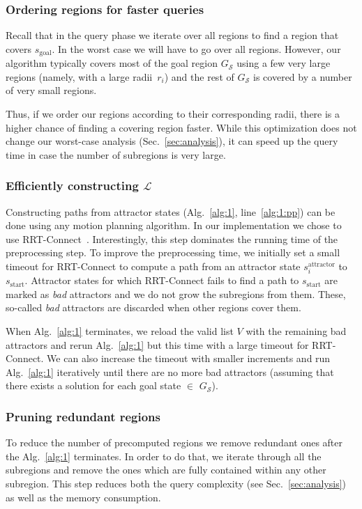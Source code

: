 \documentclass[letterpaper]{article} %
\newcommand{\calL}{\ensuremath{\mathcal{L}}\xspace}
\newcommand{\calS}{\ensuremath{\mathcal{S}}\xspace}
\newcommand{\sAttract}{\ensuremath{s^{\text{attractor}}_i}\xspace}
\newcommand{\sStart}{\ensuremath{s_{\text{start}}\xspace}}
\newcommand{\sGoal}{\ensuremath{s_{\text{goal}}\xspace}}
\begin{document}
\subsubsection{Ordering regions for faster queries}
Recall that in the query phase we iterate over all regions to find a region that covers \sGoal. 
In the worst case we will have to go over all regions.
However,  our algorithm typically covers most of the goal region $G_\calS$ using a few very large regions (namely, with a large radii~$r_i$) and the rest of $G_\calS$ is covered by a number of very small regions.

Thus, if we order our regions according to their corresponding radii, there is a higher chance of finding a covering region faster. While this optimization does not change our worst-case analysis (Sec.~\ref{sec:analysis}), it can speed up the query time in case the number of subregions is very large.

\subsubsection{Efficiently constructing $\calL$}
Constructing paths from attractor states (Alg.~\ref{alg:1}, line~\ref{alg:1:pp}) can be done using any motion planning algorithm.
In our implementation we chose to use \textsf{RRT-Connect}~\cite{KL00}.
Interestingly, this step dominates the running time of the preprocessing step.
%
To improve the preprocessing time, we initially set a small timeout for \textsf{RRT-Connect} to compute a path from an attractor state $\sAttract$ to $\sStart$.
Attractor states for which \textsf{RRT-Connect} fails to find a path to $\sStart$ are marked as \textit{bad} attractors and we do not grow the subregions from them. 
These, so-called \textit{bad} attractors are discarded when other regions cover them.

When Alg.~\ref{alg:1} terminates, we reload the valid list $V$ with the remaining bad attractors and rerun Alg.~\ref{alg:1} but this time with a large timeout for \textsf{RRT-Connect}. 
%
We can also increase the timeout with smaller increments and run Alg.~\ref{alg:1} iteratively until there are no more bad attractors (assuming that there exists a solution for each goal state $\in$ $G_\calS$).


\subsubsection{Pruning redundant regions}
To reduce the number of precomputed regions we remove redundant ones after the Alg.~\ref{alg:1} terminates. 
In order to do that, we iterate through all the subregions and remove the ones which are fully contained within any other subregion. 
This step reduces both the query complexity (see Sec.~\ref{sec:analysis}) as well as the memory consumption.
\end{document}
